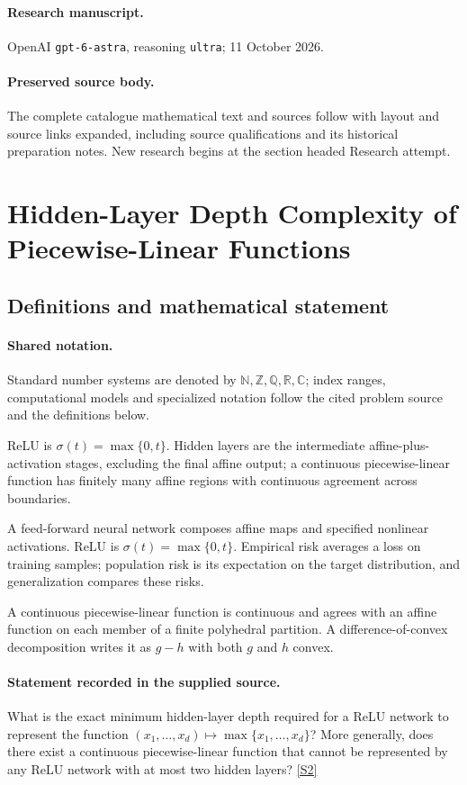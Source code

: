 \documentclass[11pt]{article}
\begin{document}
\paragraph{Research manuscript.} OpenAI \texttt{gpt-6-astra}, reasoning \texttt{ultra}; 11 October 2026.
\paragraph{Preserved source body.} The complete catalogue mathematical text and sources follow with layout and source links expanded, including source qualifications and its historical preparation notes. New research begins at the section headed Research attempt.

\section{Hidden-Layer Depth Complexity of Piecewise-Linear Functions}\label{statement}

\subsection{Definitions and mathematical statement}

\paragraph{Shared notation.}Standard number systems are denoted by $\mathbb N,\mathbb Z,\mathbb Q,\mathbb R,\mathbb C$; index ranges, computational models and specialized notation follow the cited problem source and the definitions below.


ReLU is $\sigma(t)=\max\{0,t\}$. Hidden layers are the intermediate affine-plus-activation stages, excluding the final affine output; a continuous piecewise-linear function has finitely many affine regions with continuous agreement across boundaries.

A feed-forward neural network composes affine maps and specified nonlinear activations. ReLU is $\sigma(t)=\max\{0,t\}$. Empirical risk averages a loss on training samples; population risk is its expectation on the target distribution, and generalization compares these risks.

A continuous piecewise-linear function is continuous and agrees with an affine function on each member of a finite polyhedral partition. A difference-of-convex decomposition writes it as $g-h$ with both $g$ and $h$ convex.
\paragraph{Statement recorded in the supplied source.}
What is the exact minimum hidden-layer depth required for a ReLU network to represent the function $(x_1,\ldots,x_d)\mapsto\max\{x_1,\ldots,x_d\}$? More generally, does there exist a continuous piecewise-linear function that cannot be represented by any ReLU network with at most two hidden layers? \href{https://doi.org/10.4171/owr/2026/11}{[S2]}
\end{document}
